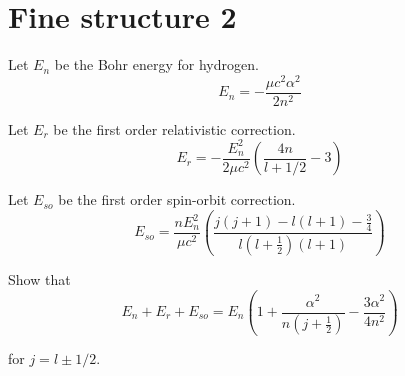 

\section*{Fine structure 2}

Let $E_n$ be the Bohr energy for hydrogen.
\begin{equation*}
E_n=-\frac{\mu c^2\alpha^2}{2n^2}
\end{equation*}

Let $E_r$ be the first order relativistic correction.
\begin{equation*}
E_r=-\frac{E_n^2}{2\mu c^2}\left(\frac{4n}{l+1/2}-3\right)
\end{equation*}

Let $E_{so}$ be the first order spin-orbit correction.
\begin{equation*}
E_{so}=\frac{nE_n^2}{\mu c^2}
\left(\frac{j(j+1)-l(l+1)-\frac{3}{4}}{l\left(l+\frac{1}{2}\right)(l+1)}\right)
\end{equation*}

Show that
\begin{equation*}
E_n+E_r+E_{so}=E_n
\left(1+\frac{\alpha^2}{n\left(j+\frac{1}{2}\right)}-\frac{3\alpha^2}{4n^2}\right)
\tag{1}
\end{equation*}

for $j=l\pm1/2$.


